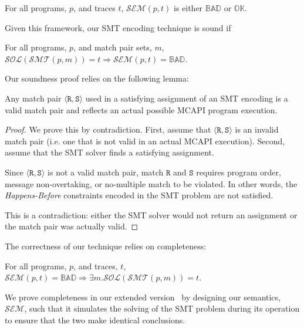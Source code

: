\begin{definition}[Semantics]
For all programs, $p$, and traces $t$, $\mathcal{SEM}(p, t)$ is either
$\mathbb{BAD}$ or $\mathbb{OK}$.
\end{definition}

Given this framework, our SMT encoding technique is sound if

\begin{theorem}[Soundness]
For all programs, $p$, and match pair sets, $m$,
$\mathcal{SOL}(\mathcal{SMT}(p, m)) = t \Rightarrow \mathcal{SEM}(p, t) =
\mathbb{BAD}$.
\end{theorem}

Our soundness proof relies on the following lemma:

\begin{lemma} \label{lem:bogus}
Any match pair $\langle \mathtt{R}, \mathtt{S}\rangle$ used in a
satisfying assignment of an SMT encoding is a valid match pair and
reflects an actual possible MCAPI program execution.
\end{lemma}
\begin{proof}
We prove this by contradiction. First, assume that $\langle
\mathtt{R}, \mathtt{S}\rangle$ is an invalid match pair (i.e. one that
is not valid in an actual MCAPI execution). Second, assume that the
SMT solver finds a satisfying assignment.

Since $\langle \mathtt{R}, \mathtt{S}\rangle$ is not a valid match
pair, match $\mathtt{R}$ and $\mathtt{S}$ requires program order,
message non-overtaking, or no-multiple match to be violated. In other
words, the \emph{Happens-Before} constraints encoded in the SMT
problem are not satisfied.

This is a contradiction: either the SMT solver would not return an
assignment or the match pair was actually valid.
\end{proof}

The correctness of our technique relies on completeness:

\begin{theorem}[Completeness]
For all programs, $p$, and traces, $t$, $\mathcal{SEM}(p, t) =
\mathbb{BAD} \Rightarrow \exists m . \mathcal{SOL}(\mathcal{SMT}(p,
m)) = t$.
\end{theorem}

We prove completeness in our extended version~\cite{extended-version}
by designing our semantics, $\mathcal{SEM}$, such that it simulates
the solving of the SMT problem during its operation to ensure that the
two make identical conclusions.

